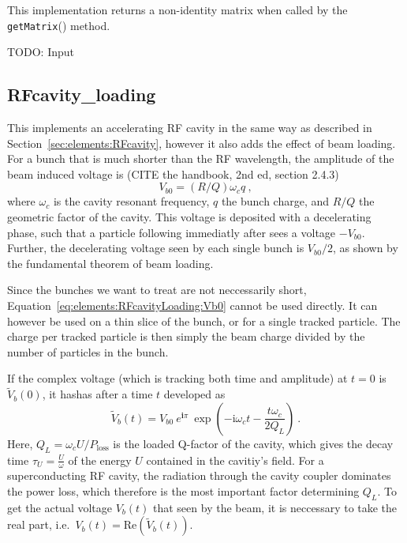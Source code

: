 \documentclass[a4paper]{report}
\begin{document}
This implementation returns a non-identity matrix when called by the \texttt{get\-Matrix}() method.

TODO: Input

\subsection{RFcavity\_loading}

This implements an accelerating RF cavity in the same way as described in Section~\ref{sec:elements:RFcavity}, however it also adds the effect of beam loading.
For a bunch that is much shorter than the RF wavelength, the amplitude of the beam induced voltage is (CITE the handbook, 2nd ed, section 2.4.3)
\begin{equation}
  V_{b0} = (R/Q) \omega_c q~,
  \label{eq:elements:RFcavityLoading:Vb0}
\end{equation}
where $\omega_c$ is the cavity resonant frequency, $q$ the bunch charge, and $R/Q$ the geometric factor of the cavity.
This voltage is deposited with a decelerating phase, such that a particle following immediatly after sees a voltage $-V_{b0}$.
Further, the decelerating voltage seen by each single bunch is $V_{b0}/2$, as shown by the fundamental theorem of beam loading.

Since the bunches we want to treat are not neccessarily short, Equation~\eqref{eq:elements:RFcavityLoading:Vb0} cannot be used directly.
It can however be used on a thin slice of the bunch, or for a single tracked particle.
The charge per tracked particle is then simply the beam charge divided by the number of particles in the bunch.

If the complex voltage (which is tracking both time and amplitude) at $t=0$ is $\tilde V_b(0)$, it hashas after a time $t$ developed as
\begin{equation}
  \tilde V_b(t) =  V_{b0} ~ e^{\mathbf{i}\pi} ~ \exp\left(-\mathrm{i}\omega_ct - \frac{t \omega_c}{2Q_L} \right)~.
  \label{eq:elements:RFcavityLoading:VbProp}
\end{equation}
Here, $Q_L = \omega_c U / P_\mathrm{loss}$ is the loaded Q-factor of the cavity, which gives the decay time $\tau_U = \frac{U}{\omega}$ of the energy $U$ contained in the cavitiy's field.
For a superconducting RF cavity, the radiation through the cavity coupler dominates the power loss, which therefore is the most important factor determining $Q_L$.
To get the actual voltage $V_b(t)$ that seen by the beam, it is neccessary to take the real part, i.e.\ $V_b(t) = \mathrm{Re}\left(\tilde V_b(t) \right)$.
\end{document}
